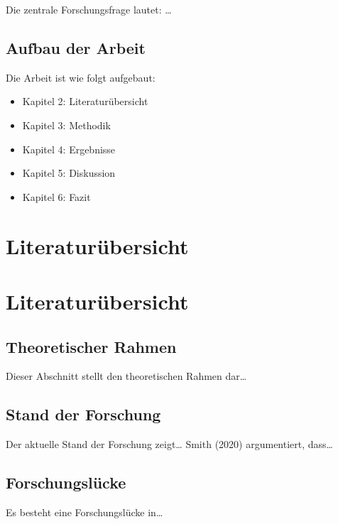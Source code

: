 \documentclass[12pt, a4paper, twoside, openright]{report}
\providecommand{\tightlist}{%
  \setlength{\itemsep}{0pt}\setlength{\parskip}{0pt}}
\begin{document}
Die zentrale Forschungsfrage lautet: \ldots{}

\section{Aufbau der Arbeit}\label{aufbau-der-arbeit}

Die Arbeit ist wie folgt aufgebaut:

\begin{itemize}
\tightlist
\item
  Kapitel 2: Literaturübersicht
\item
  Kapitel 3: Methodik
\item
  Kapitel 4: Ergebnisse
\item
  Kapitel 5: Diskussion
\item
  Kapitel 6: Fazit
\end{itemize}


\chapter{Literaturübersicht}\label{literaturuxfcbersicht}


\chapter{Literaturübersicht}\label{literaturuxfcbersicht-1}

\section{Theoretischer Rahmen}\label{theoretischer-rahmen}

Dieser Abschnitt stellt den theoretischen Rahmen dar\ldots{}

\section{Stand der Forschung}\label{stand-der-forschung}

Der aktuelle Stand der Forschung zeigt\ldots{} Smith (2020)
argumentiert, dass\ldots{}

\section{Forschungslücke}\label{forschungsluxfccke}

Es besteht eine Forschungslücke in\ldots{}
\end{document}
